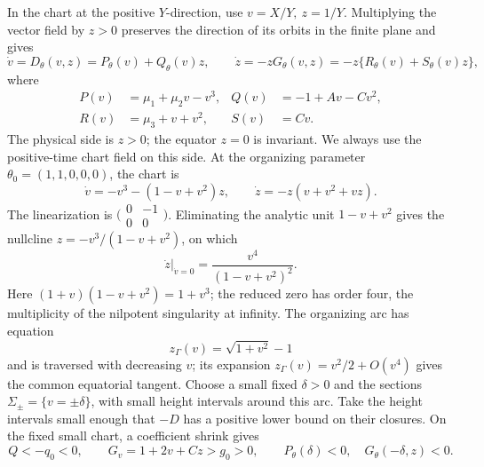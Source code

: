 In the chart at the positive \(Y\)-direction, use
\(v=X/Y,\ z=1/Y\). Multiplying the vector field by \(z>0\) preserves
the direction of its orbits in the finite plane and gives
\begin{equation}\label{eq:raw}
 \dot v=D_\theta(v,z)=P_\theta(v)+Q_\theta(v)z,\qquad
 \dot z=-zG_\theta(v,z)=-z\{R_\theta(v)+S_\theta(v)z\},
\end{equation}
where
\begin{equation}\label{eq:polynomials}
 \begin{aligned}
 P(v)&=\mu_1+\mu_2v-v^3,& Q(v)&=-1+Av-Cv^2,\\
 R(v)&=\mu_3+v+v^2,& S(v)&=Cv .
 \end{aligned}
\end{equation}
The physical side is \(z>0\); the equator \(z=0\) is invariant.
We always use the positive-time chart field on this side.
At the organizing parameter \(\theta_0=(1,1,0,0,0)\), the chart is
\begin{equation}\label{eq:infinity-chart-field}
 \dot v=-v^3-(1-v+v^2)z,\qquad
 \dot z=-z(v+v^2+vz).
\end{equation}
The linearization is \(\bigl(\begin{smallmatrix}0&-1\\0&0\end{smallmatrix}\bigr)\).
Eliminating the analytic unit \(1-v+v^2\) gives the nullcline
\(z=-v^3/(1-v+v^2)\), on which
\begin{equation}\label{eq:infinity-multiplicity-four}
 \left.\dot z\right|_{\dot v=0}
 =\frac{v^4}{(1-v+v^2)^2}.
\end{equation}
Here \((1+v)(1-v+v^2)=1+v^3\); the reduced zero has order four,
the multiplicity of the nilpotent singularity at infinity.
The organizing arc has equation
\begin{equation}\label{eq:organizing-arc}
 z_\Gamma(v)=\sqrt{1+v^2}-1
\end{equation}
and is traversed with decreasing \(v\); its expansion
\(z_\Gamma(v)=v^2/2+O(v^4)\) gives the common equatorial tangent.
Choose a small fixed \(\delta>0\) and the sections
\(\Sigma_\pm=\{v=\pm\delta\}\), with small height intervals around this arc.
Take the height intervals small enough that \(-D\) has a positive lower
bound on their closures.
On the fixed small chart, a coefficient shrink gives
\begin{equation}\label{loc:signs}
 Q<-q_0<0,\qquad G_v=1+2v+Cz>g_0>0,\qquad
 P_\theta(\delta)<0,\quad G_\theta(-\delta,z)<0.
\end{equation}

